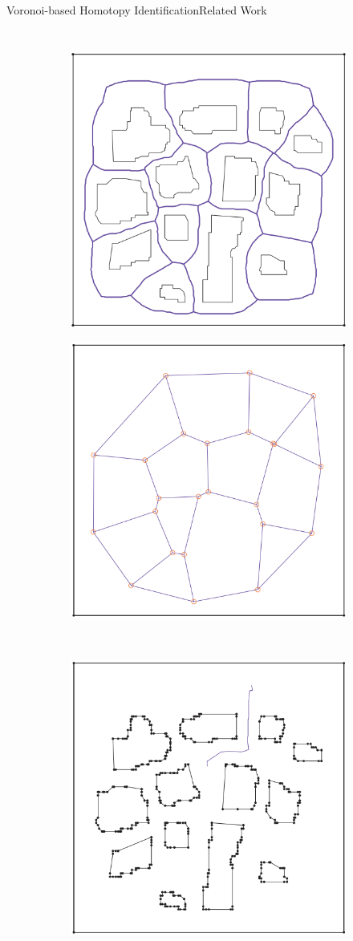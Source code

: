 \begin{frame}{Voronoi-based Homotopy Identification}{Related Work}

\begin{columns}

\begin{figure}
\begin{subfigure}
	\centering
	\includegraphics[width=.45\linewidth]{figure/voronoi_homotopy1}
\end{subfigure}
\begin{subfigure}
	\centering
	\includegraphics[width=.45\linewidth]{figure/voronoi_homotopy2}
\end{subfigure}
\\
\begin{subfigure}
	\centering
	\includegraphics[width=.45\linewidth]{figure/voronoi_homotopy3}

\end{subfigure}
\end{figure}
\end{columns}
\end{frame}
